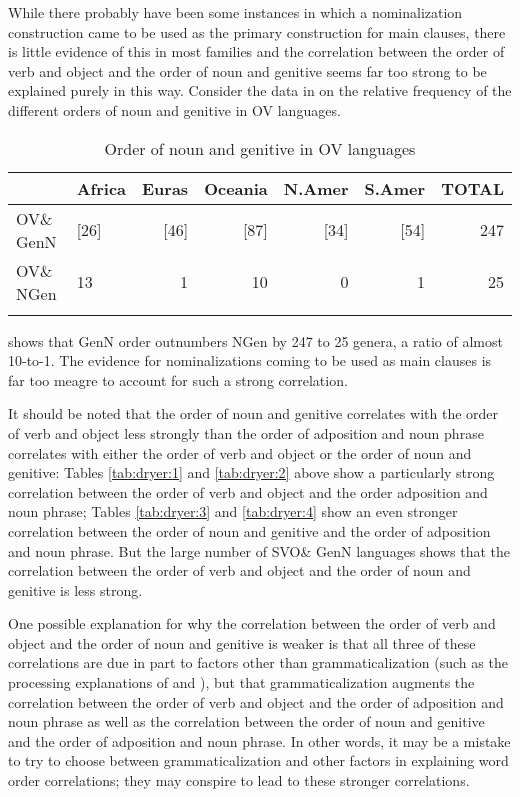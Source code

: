 \documentclass[output=paper]{langsci/langscibook}
\begin{document}
While there probably have been some instances in which a nominalization construction came to be used as the primary construction for main clauses, there is little evidence of this in most families and the correlation between the order of verb and object and the order of noun and genitive seems far too strong to be explained purely in this way. Consider the data in  on the relative frequency of the different orders of noun and genitive in OV languages.

\begin{table}
\begin{tabularx}{\textwidth}{Xlrrrrr}
\lsptoprule
& \bfseries Africa & \bfseries Euras & \bfseries Oceania & \bfseries N.Amer & \bfseries S.Amer & \bfseries TOTAL\\
\midrule
OV\& GenN & [26] & [46] & [87] & [34] & [54] & 247\\
OV\& NGen & 13 & 1 & 10 & 0 & 1 & 25\\
\lspbottomrule
\end{tabularx}
\caption{\label{tab:dryer:7}Order of noun and genitive in OV languages}
\end{table}

 shows that GenN order outnumbers NGen by 247 to 25 genera, a ratio of almost 10-to-1. The evidence for nominalizations coming to be used as main clauses is far too meagre to account for such a strong correlation.

It should be noted that the order of noun and genitive correlates with the order of verb and object less strongly than the order of adposition and noun phrase correlates with either the order of verb and object or the order of noun and genitive: Tables \ref{tab:dryer:1} and \ref{tab:dryer:2} above show a particularly strong correlation between the order of verb and object and the order adposition and noun phrase; Tables \ref{tab:dryer:3} and \ref{tab:dryer:4} show an even stronger correlation between the order of noun and genitive and the order of adposition and noun phrase. But the large number of SVO\& GenN languages shows that the correlation between the order of verb and object and the order of noun and genitive is less strong.

One possible explanation for why the correlation between the order of verb and object and the order of noun and genitive is weaker is that all three of these correlations are due in part to factors other than grammaticalization (such as the processing explanations of \citealt{Dryer1992} and \citealt{Hawkins1994,Hawkins2004,Hawkins2014_VarEff}), but that grammaticalization augments the correlation between the order of verb and object and the order of adposition and noun phrase as well as the correlation between the order of noun and genitive and the order of adposition and noun phrase. In other words, it may be a mistake to try to choose between grammaticalization and other factors in explaining word order correlations; they may conspire to lead to these stronger correlations.
\end{document}
